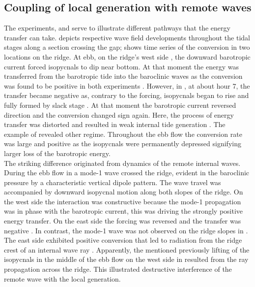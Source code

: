 \documentclass[12pt]{article}
\begin{document}
\subsection{Coupling of local generation with remote waves}
\label{C3.sec:amp_mech}
\newpage
The experiments,  and  serve to illustrate different pathways that the 
energy transfer can take.  
depicts respective wave field developments 
throughout the tidal stages along a section crossing the gap;  
shows time series of the 
conversion in two locations on the ridge. At ebb, on the ridge's west side 
, the downward barotropic current forced isopycnals 
to 
dip near bottom. 
At that moment the energy was transferred from the barotropic tide into the baroclinic waves as the 
conversion was found to be positive in 
both experiments . However, in , at about hour 7, the transfer 
became 
negative as, 
contrary to the forcing, isopycnals began to rise and fully formed by slack stage 
. At that moment the barotropic current reversed direction and the 
conversion changed sign again. Here, the process of energy transfer was distorted and resulted 
in weak internal tide generation 
. 
The example of  revealed other regime. Throughout the ebb flow the conversion rate was  
large and positive as the isopycnals were permanently depressed signifying larger loss of the 
barotropic energy.\\

The striking difference originated from dynamics of the remote internal waves. During the ebb flow 
in  a mode-1 wave crossed the ridge, evident in the 
baroclinic pressure by a characteristic vertical dipole pattern. The wave travel was accompanied by 
downward isopycnal motion along both slopes of the ridge. On the west side the interaction was 
constructive because the mode-1 propagation was in phase with the barotropic current, this 
was driving the strongly positive energy transfer. On the east side the forcing was reversed and 
the transfer was negative . In contrast, the mode-1 wave 
was not observed on the ridge slopes in . The east side exhibited positive conversion 
that led to radiation  from the ridge crest of an internal wave ray . Apparently, the mentioned previously lifting of the isopycnals in the middle of the 
ebb flow on the west side in  resulted from the ray propagation across the ridge. This 
illustrated destructive interference of the remote wave with the local generation.\\
\end{document}
